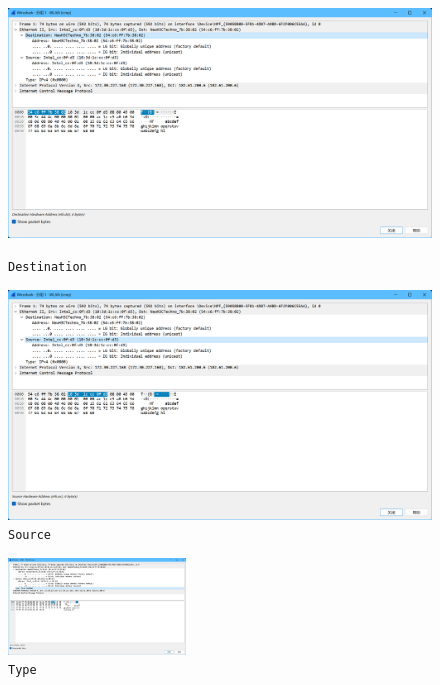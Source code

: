 \documentclass{article}
\begin{document}
\begin{figure}[H]
  \centering
  \begin{minipage}[b]{0.42\textwidth}
    \centering
    \includegraphics[width=\textwidth]{images/06.png}
    \caption{\texttt{Destination}}
  \end{minipage}
  \hfill
  \begin{minipage}[b]{0.42\textwidth}
    \centering
    \includegraphics[width=\textwidth]{images/07.png}
    \caption{\texttt{Source}}
  \end{minipage}
\end{figure}

\begin{figure}[H]
  \centering
  \includegraphics[width=0.42\textwidth]{images/08.png}
  \caption{\texttt{Type}}
\end{figure}
\end{document}
